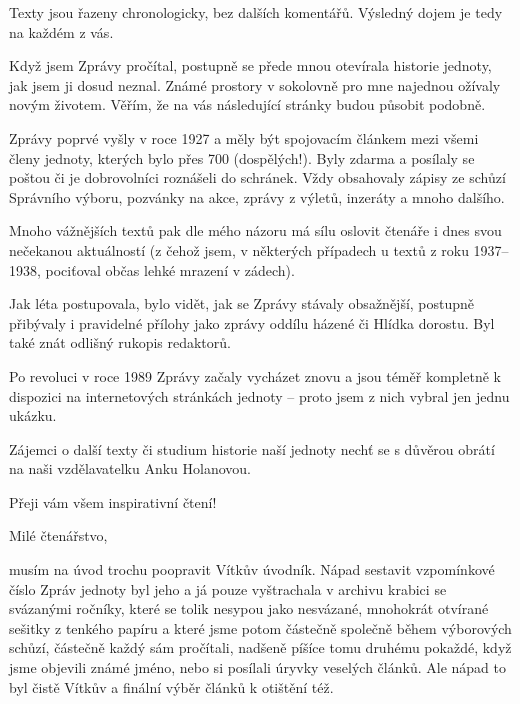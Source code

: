 \documentclass[11pt]{article}
\begin{document}
Texty jsou řazeny chronologicky, bez dalších komentářů. Výsledný dojem
je tedy na každém z vás.

Když jsem Zprávy pročítal, postupně se přede mnou otevírala historie
jednoty, jak jsem ji dosud neznal. Známé prostory v sokolovně pro mne
najednou ožívaly novým životem. Věřím, že na vás následující stránky
budou působit podobně.

Zprávy poprvé vyšly v roce 1927 a měly být spojovacím článkem mezi všemi
členy jednoty, kterých bylo přes 700 (dospělých!). Byly zdarma a
posílaly se poštou či je dobrovolníci roznášeli do schránek. Vždy
obsahovaly zápisy ze schůzí Správního výboru, pozvánky na akce, zprávy z
výletů, inzeráty a mnoho dalšího.

Mnoho vážnějších textů pak dle mého názoru má sílu oslovit čtenáře i
dnes svou nečekanou aktuálností (z čehož jsem, v některých případech u
textů z roku 1937--1938, pociťoval občas lehké mrazení v zádech).

Jak léta postupovala, bylo vidět, jak se Zprávy stávaly obsažnější,
postupně přibývaly i pravidelné přílohy jako zprávy oddílu házené či
Hlídka dorostu. Byl také znát odlišný rukopis redaktorů.

Po revoluci v roce 1989 Zprávy začaly vycházet znovu a jsou téměř
kompletně k dispozici na internetových stránkách jednoty -- proto jsem z
nich vybral jen jednu ukázku.

Zájemci o další texty či studium historie naší jednoty nechť se s
důvěrou obrátí na naši vzdělavatelku Anku Holanovou.

Přeji vám všem inspirativní čtení!

\clearpage



\noindent
Milé čtenářstvo,

\noindent
musím na úvod trochu poopravit Vítkův úvodník. Nápad sestavit
vzpomínkové číslo Zpráv jednoty byl jeho a já pouze vyštrachala v
archivu krabici se svázanými ročníky, které se tolik nesypou jako
nesvázané, mnohokrát otvírané sešitky z tenkého papíru a které jsme
potom částečně společně během výborových schůzí, částečně každý sám
pročítali, nadšeně píšíce tomu druhému pokaždé, když jsme objevili známé
jméno, nebo si posílali úryvky veselých článků. Ale nápad to byl čistě
Vítkův a finální výběr článků k otištění též.
\end{document}
